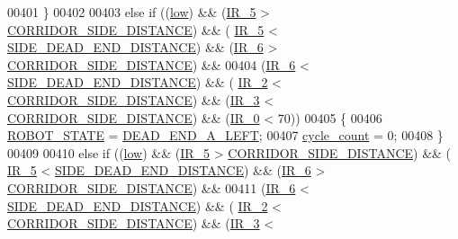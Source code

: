 \begin{DoxyCode}
00401             \}
00402             
00403             \textcolor{keywordflow}{else} \textcolor{keywordflow}{if} ((\hyperlink{state__machine_8h_a326373dcfd381c9473382a1f538de2a8}{low}) && (\hyperlink{state__machine_8c_ad00ba6cc1cf461bda7059f5aafc06142}{IR\_5} > \hyperlink{state__machine_8c_a201d56046ddf552d57b4862e0ec07a10}{CORRIDOR\_SIDE\_DISTANCE}) && (
      \hyperlink{state__machine_8c_ad00ba6cc1cf461bda7059f5aafc06142}{IR\_5} < \hyperlink{state__machine_8c_a31ba7e3e0116f665d5825f669052ed09}{SIDE\_DEAD\_END\_DISTANCE}) && (\hyperlink{state__machine_8c_a8c51bcd8b555e8c78fea79b88d28b55e}{IR\_6} > 
      \hyperlink{state__machine_8c_a201d56046ddf552d57b4862e0ec07a10}{CORRIDOR\_SIDE\_DISTANCE}) &&
00404                      (\hyperlink{state__machine_8c_a8c51bcd8b555e8c78fea79b88d28b55e}{IR\_6} < \hyperlink{state__machine_8c_a31ba7e3e0116f665d5825f669052ed09}{SIDE\_DEAD\_END\_DISTANCE}) && (
      \hyperlink{state__machine_8c_a07cfb2e201909d017a88a2a86c32cd4b}{IR\_2} < \hyperlink{state__machine_8c_a201d56046ddf552d57b4862e0ec07a10}{CORRIDOR\_SIDE\_DISTANCE}) && (\hyperlink{state__machine_8c_a7831b71dc250258ecefe0e23f9920688}{IR\_3} < 
      \hyperlink{state__machine_8c_a201d56046ddf552d57b4862e0ec07a10}{CORRIDOR\_SIDE\_DISTANCE}) && (\hyperlink{state__machine_8c_a7afcf874a71b2cde367dc9c28f5f01f1}{IR\_0} < 70))
00405             \{
00406                 \hyperlink{state__machine_8h_a5e5321a4a9085b83c8161454bf7a145c}{ROBOT\_STATE} = \hyperlink{state__machine_8h_a94b1da2e055fff4d143aa6aa891f79a9a92ca0c1053b63e149cfdbf61c7163f5a}{DEAD\_END\_A\_LEFT};
00407                 \hyperlink{state__machine_8c_a937f74a65988b9e22241ab3765b82c50}{cycle\_count} = 0;
00408             \}
00409             
00410             \textcolor{keywordflow}{else} \textcolor{keywordflow}{if} ((\hyperlink{state__machine_8h_a326373dcfd381c9473382a1f538de2a8}{low}) && (\hyperlink{state__machine_8c_ad00ba6cc1cf461bda7059f5aafc06142}{IR\_5} > \hyperlink{state__machine_8c_a201d56046ddf552d57b4862e0ec07a10}{CORRIDOR\_SIDE\_DISTANCE}) && (
      \hyperlink{state__machine_8c_ad00ba6cc1cf461bda7059f5aafc06142}{IR\_5} < \hyperlink{state__machine_8c_a31ba7e3e0116f665d5825f669052ed09}{SIDE\_DEAD\_END\_DISTANCE}) && (\hyperlink{state__machine_8c_a8c51bcd8b555e8c78fea79b88d28b55e}{IR\_6} > 
      \hyperlink{state__machine_8c_a201d56046ddf552d57b4862e0ec07a10}{CORRIDOR\_SIDE\_DISTANCE}) && 
00411                      (\hyperlink{state__machine_8c_a8c51bcd8b555e8c78fea79b88d28b55e}{IR\_6} < \hyperlink{state__machine_8c_a31ba7e3e0116f665d5825f669052ed09}{SIDE\_DEAD\_END\_DISTANCE}) && (
      \hyperlink{state__machine_8c_a07cfb2e201909d017a88a2a86c32cd4b}{IR\_2} < \hyperlink{state__machine_8c_a201d56046ddf552d57b4862e0ec07a10}{CORRIDOR\_SIDE\_DISTANCE}) && (\hyperlink{state__machine_8c_a7831b71dc250258ecefe0e23f9920688}{IR\_3} < 

\end{DoxyCode}
